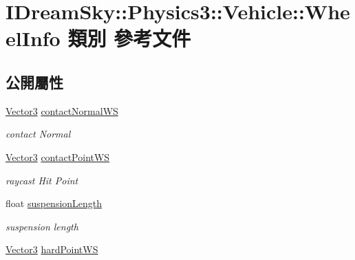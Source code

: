 \hypertarget{class_i_dream_sky_1_1_physics3_1_1_vehicle_1_1_wheel_info}{}\section{I\+Dream\+Sky\+:\+:Physics3\+:\+:Vehicle\+:\+:Wheel\+Info 類別 參考文件}
\label{class_i_dream_sky_1_1_physics3_1_1_vehicle_1_1_wheel_info}
\subsection*{公開屬性}
\begin{DoxyCompactItemize}
\item 
\hyperlink{class_i_dream_sky_1_1_vector3}{Vector3} \hyperlink{class_i_dream_sky_1_1_physics3_1_1_vehicle_1_1_wheel_info_ab6bdf3de46d2e828a23edfb3e0a2dfd9}{contact\+Normal\+WS}\hypertarget{class_i_dream_sky_1_1_physics3_1_1_vehicle_1_1_wheel_info_ab6bdf3de46d2e828a23edfb3e0a2dfd9}{}\label{class_i_dream_sky_1_1_physics3_1_1_vehicle_1_1_wheel_info_ab6bdf3de46d2e828a23edfb3e0a2dfd9}

\begin{DoxyCompactList}\small\item\em contact Normal \end{DoxyCompactList}\item 
\hyperlink{class_i_dream_sky_1_1_vector3}{Vector3} \hyperlink{class_i_dream_sky_1_1_physics3_1_1_vehicle_1_1_wheel_info_a035ecb98baa4034989c43a874f9cf887}{contact\+Point\+WS}\hypertarget{class_i_dream_sky_1_1_physics3_1_1_vehicle_1_1_wheel_info_a035ecb98baa4034989c43a874f9cf887}{}\label{class_i_dream_sky_1_1_physics3_1_1_vehicle_1_1_wheel_info_a035ecb98baa4034989c43a874f9cf887}

\begin{DoxyCompactList}\small\item\em raycast Hit Point \end{DoxyCompactList}\item 
float \hyperlink{class_i_dream_sky_1_1_physics3_1_1_vehicle_1_1_wheel_info_a32fc0ff5c23217ec30fc71444ff02260}{suspension\+Length}\hypertarget{class_i_dream_sky_1_1_physics3_1_1_vehicle_1_1_wheel_info_a32fc0ff5c23217ec30fc71444ff02260}{}\label{class_i_dream_sky_1_1_physics3_1_1_vehicle_1_1_wheel_info_a32fc0ff5c23217ec30fc71444ff02260}

\begin{DoxyCompactList}\small\item\em suspension length \end{DoxyCompactList}\item 
\hyperlink{class_i_dream_sky_1_1_vector3}{Vector3} \hyperlink{class_i_dream_sky_1_1_physics3_1_1_vehicle_1_1_wheel_info_a1a565b061245f805649e3be06d9ccedd}{hard\+Point\+WS}\hypertarget{class_i_dream_sky_1_1_physics3_1_1_vehicle_1_1_wheel_info_a1a565b061245f805649e3be06d9ccedd}{}\label{class_i_dream_sky_1_1_physics3_1_1_vehicle_1_1_wheel_info_a1a565b061245f805649e3be06d9ccedd}


\end{DoxyCompactItemize}
